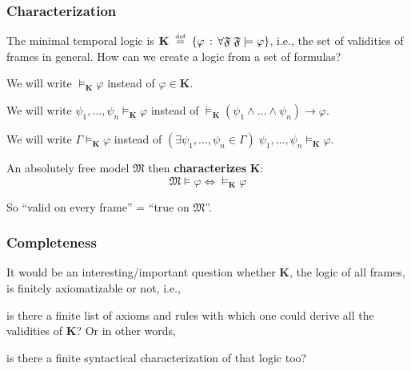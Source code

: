 \documentclass[xcolor=x11names]{beamer}
\renewcommand{\emph}[1]{\textbf{#1}}
\newcommand{\defegy}[1][.1]{\hspace{#1cm}\overset{\textup{\tiny def}}{=}\hspace{#1cm}}
\newcommand{\lthen}{\rightarrow}
\newcommand{\existsin}[2]{(\exists #1 \in #2)}
\begin{document}

\begin{frame}
\frametitle{Characterization}

The minimal temporal logic is $\mathbf K \defegy \{ \varphi \, :\, \forall \mathfrak F \; \mathfrak F \models \varphi  \} $, i.e., the set of validities of frames in general. How can we create a logic from a set of formulas?

\bigskip

We will write $\models_{\mathbf K} \varphi $ instead of $\varphi \in \mathbf K$.

\bigskip

We will write $\psi_1, \dots , \psi_n \models_{\mathbf K} \varphi $ instead of $\models_{\mathbf K} (\psi_1\land \dots \land \psi_n) \lthen \varphi $.

\bigskip

We will write $\Gamma \models_{\mathbf K} \varphi $ instead of $\existsin {\psi_1, \dots , \psi_n}{\Gamma} \; \psi_1, \dots , \psi_n \models_{\mathbf K} \varphi $.

\bigskip

An absolutely free model $\mathfrak M$ then \emph{characterizes} $\mathbf{K}$:
\[ \mathfrak M \models \varphi \iff \models_{\mathbf K}  \varphi \]

\bigskip

So ``valid on every frame'' = ``true on $\mathfrak M$''.

\end{frame}



\begin{frame}
\frametitle{Completeness}

It would be an interesting/important question whether $\mathbf K$, the logic of all frames, is finitely axiomatizable or not, i.e.,

\bigskip

is there a finite list of axioms and rules with which one could derive all the validities of $\mathbf K$? Or in other words,

\bigskip

is there a finite syntactical characterization of that logic too?

\end{frame}

\end{document}

